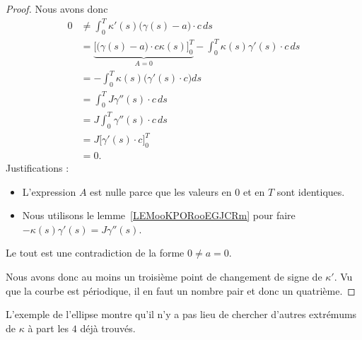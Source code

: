 \begin{proof}
	Nous avons donc
	\begin{subequations}
		\begin{align}
			0 & \neq \int_0^T\kappa'(s)\big( \gamma(s)-a \big)\cdot c\,ds                                                            \\
			  & =\underbrace{\Big[ \big( \gamma(s)-a \big)\cdot c\kappa(s) \Big]_0^{T}}_{A=0}-\int_0^T\kappa(s)\gamma'(s)\cdot c\,ds \\
			  & =-\int_0^T\kappa(s)\big( \gamma'(s)\cdot c \big)ds                                                                   \\
			  & =\int_0^TJ\gamma''(s)\cdot c\,ds                                                                                     \\
			  & =J\int_0^T\gamma''(s)\cdot c\,ds                                                                                     \\
			  & =J\big[ \gamma'(s)\cdot c \big]_0^T                                                                                  \\
			  & =0.
		\end{align}
	\end{subequations}
	Justifications :
	\begin{itemize}
		\item
		      L'expression \( A\) est nulle parce que les valeurs en \( 0\) et en \( T\) sont identiques.
		\item
		      Nous utilisons le lemme~\ref{LEMooKPORooEGJCRm} pour faire \( -\kappa(s)\gamma'(s)=J\gamma''(s)\).
	\end{itemize}
	Le tout est une contradiction de la forme \( 0\neq a=0\).

	Nous avons donc au moins un troisième point de changement de signe de \( \kappa'\). Vu que la courbe est périodique, il en faut un nombre pair et donc un quatrième.
\end{proof}

L'exemple de l'ellipse montre qu'il n'y a pas lieu de chercher d'autres extrémums de \( \kappa\) à part les \( 4\) déjà trouvés.

